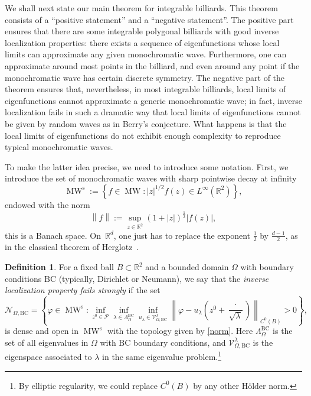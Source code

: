 \documentclass{amsart}
\theoremstyle{definition}
\newtheorem{definition}[theorem]{Definition}
\theoremstyle{remark}
\def\RR{\mathbb{R}}
\numberwithin{equation}{section}
\theoremstyle{definition}
\theoremstyle{remark}
\def\RR{\mathbb{R}}
\DeclareMathOperator\MW{MW}
\begin{document}
We shall next state our main theorem for integrable billiards. This theorem consists of a ``positive statement'' and a ``negative statement''. The positive part ensures that there are some integrable polygonal billiards with good inverse localization properties: there exists a sequence of eigenfunctions whose local limits can approximate any given monochromatic wave. Furthermore, one can approximate around most points in the billiard, and even around any point if the monochromatic wave has certain discrete symmetry. The negative part of the theorem ensures that, nevertheless, in most integrable billiards, local limits of eigenfunctions cannot approximate a generic monochromatic wave; in fact, inverse localization fails in such a dramatic way that local limits of eigenfunctions cannot be given by random waves as in Berry's conjecture. What happens is that the local limits of eigenfunctions do not exhibit enough complexity to reproduce typical monochromatic waves.


To make the latter idea precise, we need to introduce some notation.  First, we introduce the set of monochromatic waves with sharp pointwise decay at infinity
\begin{equation}\label{def.MWs}
	\MW^{\mathrm{s}}:=\left\{f\in \MW : |z|^{1/2}f(z)\in L^\infty(\RR^2)\right\},
\end{equation}
 endowed with the norm \begin{equation}\label{norm}
	\left\|f\right\|:=\sup_{z\in \mathbb{R}^2}\left(1+\left|z\right|\right)^{\frac{1}{2}} \left| f(z)\right|,
\end{equation}this is a Banach space. On~$\RR^d$, one just has to replace the exponent $\frac12$ by $\frac{d-1}2$, as in the classical theorem of Herglotz~\cite[Theorem 7.1.28]{Hor}.

\begin{definition}\label{NOIL}
	For a fixed ball $B\subset\mathbb{R}^2$ and a bounded domain $\Omega$ with boundary conditions $\mathrm{BC}$ (typically, Dirichlet or Neumann), we say that the \emph{inverse localization property fails strongly}\/ if the set \begin{equation}
		\mathcal{N}_{\Omega,\mathrm{BC}}=\left\{\varphi\in \MW^{\mathrm{s}}: \inf_{z^0\in\mathcal{P}}\inf_{\lambda\in \Lambda_\Omega^{\mathrm{BC}}}\inf_{u_\lambda\in\mathcal{V}_{\Omega,\mathrm{BC}}^\lambda}\left\|\varphi-u_\lambda\left(z^0+\frac{\cdot}{\sqrt{\lambda}}\right)\right\|_{C^0\left(B\right)}>0\right\},
	\end{equation} is dense and open in $\MW^{\mathrm{s}}$ with the topology given by \eqref{norm}. Here $\Lambda_\Omega^{\mathrm{BC}}$ is the set of all eigenvalues in $\Omega$ with $\mathrm{BC}$ boundary conditions, and $\mathcal{V}_{\Omega,\mathrm{BC}}^\lambda$ is the eigenspace associated to $\lambda$ in the same eigenvalue problem.\footnote{By elliptic regularity, we could replace $C^0(B)$ by any other H\"older norm.}
\end{definition}
\end{document}
